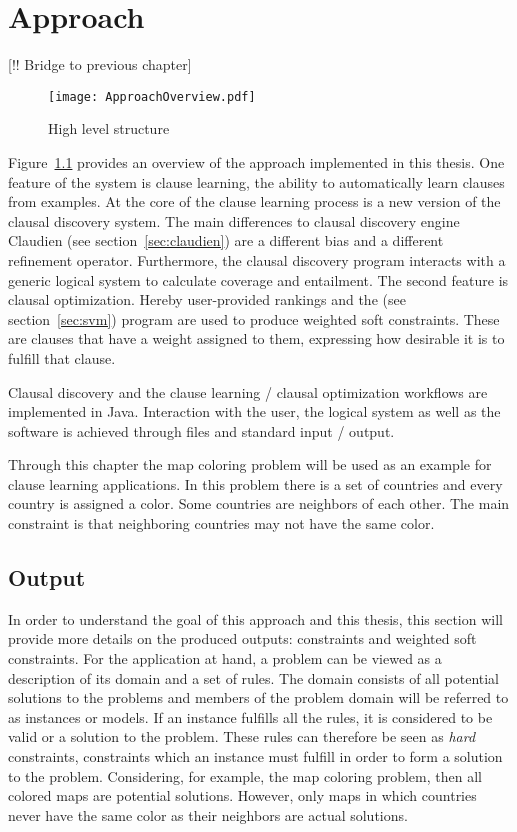 \chapter{Approach}
\label{cha:meth}

[!! Bridge to previous chapter]

\begin{figure}

	\caption{High level structure}
	\centering
		\texttt{[image: ApproachOverview.pdf]}
	\label{fig:high_level_structure}

\end{figure}

Figure~\ref{fig:high_level_structure} provides an overview of the approach implemented in this thesis.
One feature of the system is clause learning, the ability to automatically learn clauses from examples.
At the core of the clause learning process is a new version of the clausal discovery system.
The main differences to clausal discovery engine Claudien (see section~\ref{sec:claudien}) are a different bias and a different refinement operator.
Furthermore, the clausal discovery program interacts with a generic logical system to calculate coverage and entailment.
The second feature is clausal optimization.
Hereby user-provided rankings and the \svm{} (see section~\ref{sec:svm}) program are used to produce weighted soft constraints.
These are clauses that have a weight assigned to them, expressing how desirable it is to fulfill that clause.

Clausal discovery and the clause learning / clausal optimization workflows are implemented in Java.
Interaction with the user, the logical system as well as the \svm{} software is achieved through files and standard input / output.

Through this chapter the map coloring problem will be used as an example for clause learning applications.
In this problem there is a set of countries and every country is assigned a color.
Some countries are neighbors of each other.
The main constraint is that neighboring countries may not have the same color.

\section{Output}
In order to understand the goal of this approach and this thesis, this section will provide more details on the produced outputs: constraints and weighted soft constraints.
For the application at hand, a problem can be viewed as a description of its domain and a set of rules.
The domain consists of all potential solutions to the problems and members of the problem domain will be referred to as instances or models.
If an instance fulfills all the rules, it is considered to be valid or a solution to the problem.
These rules can therefore be seen as \textit{hard} constraints, constraints which an instance must fulfill in order to form a solution to the problem.
Considering, for example, the map coloring problem, then all colored maps are potential solutions.
However, only maps in which countries never have the same color as their neighbors are actual solutions.

